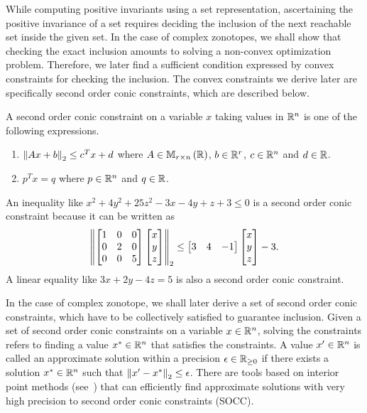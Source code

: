 While computing positive invariants using a set representation,
ascertaining the positive invariance of a set requires deciding the
inclusion of the next reachable set inside the given set.  In the case
of complex zonotopes, we shall show that checking the exact inclusion
amounts to solving a non-convex optimization problem.  Therefore,
we later find a sufficient condition expressed by convex constraints
for checking the inclusion.  The convex constraints we derive later
are specifically second order conic constraints, which are described
below.
%
\begin{definition}
A second order conic constraint on a variable $x$ taking values in
$\mathbb{R}^n$ is one of the following expressions.
\begin{enumerate}
\item $\left\|Ax+b\right\|_{2}\leq c^Tx+d$ where $A\in\mathbb{M}_{r\times n}\left(\mathbb{R}\right)$,
  $b\in\mathbb{R}^r$, $c\in\mathbb{R}^n$ and $d\in\mathbb{R}$.
\item $p^Tx=q$ where $p\in\mathbb{R}^n$ and $q\in\mathbb{R}$.
\end{enumerate}
\end{definition}
%
\begin{example}
%
An inequality like $x^2+4y^2+25z^2-3x-4y+z+3\leq 0$ is a second order
  conic constraint because it can be written as
%
\[
\left\|\left[\begin{matrix}
    1 & 0 & 0\\
    0 & 2 & 0\\
    0 & 0 & 5
\end{matrix}\right]\left[\begin{matrix}x\\y\\z\end{matrix}\right]\right\|_2\leq \left[\begin{matrix}3 & 4 & -1\end{matrix}\right]\left[\begin{matrix}x\\y\\z\end{matrix}\right]-3.
\]
A linear equality like $3x+2y-4z=5$ is also a second order conic
constraint.
\end{example}
%
In the case of complex zonotope, we shall later derive a set of second
order conic constraints, which have to be collectively satisfied to
guarantee inclusion.  Given a set of second order conic constraints on
a variable $x\in\mathbb{R}^n$, solving the constraints refers to finding a
value $x^*\in\mathbb{R}^n$ that satisfies the constraints.  A value
$x^\prime\in\mathbb{R}^n$ is called an approximate solution within a
precision $\epsilon\in\mathbb{R}_{\geq 0}$ if there exists a solution
$x^*\in\mathbb{R}^n$ such that $\left\|x^\prime-x^*\right\|_{2}\leq \epsilon$.  There
are tools based on interior point methods (see~\cite{grant2008cvx})
that can efficiently find approximate solutions with very high
precision to second order conic constraints (SOCC).

